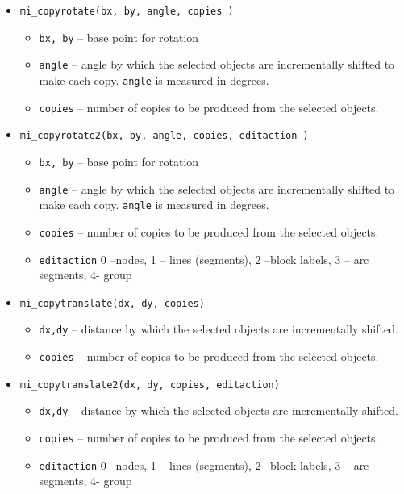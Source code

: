 \begin{itemize}
\item{\tt mi\_copyrotate(bx, by, angle, copies )}
        \begin{itemize}
        \item{\tt bx, by} -- base point for rotation
        \item{\tt angle} -- angle by which the selected objects are incrementally
        shifted to make each copy.  {\tt angle} is measured in degrees.
        \item{\tt copies} -- number of copies to be produced from
        the selected objects.
        \end{itemize}

\item{\tt mi\_copyrotate2(bx, by, angle, copies, editaction )}
        \begin{itemize}
        \item{\tt bx, by} -- base point for rotation
        \item{\tt angle} -- angle by which the selected objects are incrementally
        shifted to make each copy.  {\tt angle} is measured in degrees.
        \item{\tt copies} -- number of copies to be produced from
        the selected objects.
        \item{\tt editaction}  0 --nodes, 1 -- lines (segments), 2 --block labels, 3 -- arc
                segments, 4- group
        \end{itemize}

\item{\tt mi\_copytranslate(dx, dy, copies)}
        \begin{itemize}
        \item{\tt dx,dy} -- distance by which the selected objects are incrementally shifted.
        \item{\tt copies} -- number of copies to be produced from the selected objects.
        \end{itemize}

\item{\tt mi\_copytranslate2(dx, dy, copies, editaction)}
        \begin{itemize}
        \item{\tt dx,dy} -- distance by which the selected objects are incrementally shifted.
        \item{\tt copies} -- number of copies to be produced from the selected objects.
        \item{\tt editaction}  0 --nodes, 1 -- lines (segments), 2 --block labels, 3 -- arc
                segments, 4- group
        \end{itemize}


\end{itemize}
